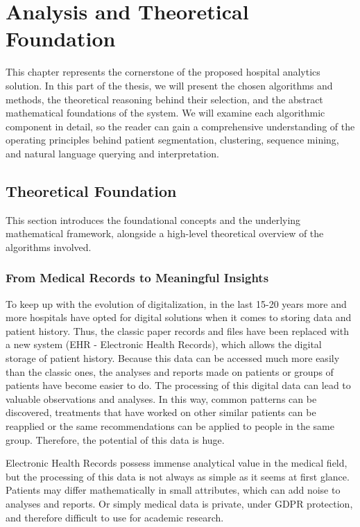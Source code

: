 \chapter{Analysis and Theoretical Foundation}
\label{ch:analysis}
\pagestyle{fancy}

This chapter represents the cornerstone of the proposed hospital analytics solution. In this part of the thesis, we will present the chosen algorithms and methods, the theoretical reasoning behind their selection, and the abstract mathematical foundations of the system. We will examine each algorithmic component in detail, so the reader can gain a comprehensive understanding of the operating principles behind patient segmentation, clustering, sequence mining, and natural language querying and interpretation.

\section{Theoretical Foundation}

This section introduces the foundational concepts and the underlying mathematical framework, alongside a high-level theoretical overview of the algorithms involved.

\subsection{From Medical Records to Meaningful Insights}

To keep up with the evolution of digitalization, in the last 15-20 years more and more hospitals have opted for digital solutions when it comes to storing data and patient history. Thus, the classic paper records and files have been replaced with a new system (EHR - Electronic Health Records), which allows the digital storage of patient history. Because this data can be accessed much more easily than the classic ones, the analyses and reports made on patients or groups of patients have become easier to do. The processing of this digital data can lead to valuable observations and analyses. In this way, common patterns can be discovered, treatments that have worked on other similar patients can be reapplied or the same recommendations can be applied to people in the same group. Therefore, the potential of this data is huge.

Electronic Health Records possess immense analytical value in the medical field, but the processing of this data is not always as simple as it seems at first glance. Patients may differ mathematically in small attributes, which can add noise to analyses and reports. Or simply medical data is private, under GDPR protection, and therefore difficult to use for academic research.

